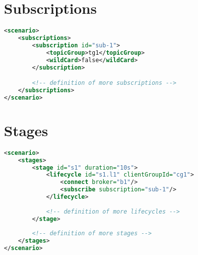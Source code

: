 \section{Subscriptions}
\begin{lstlisting}[caption={XMl definition of subscriptions}, captionpos=b, label={lst:subscriptions}, language=XML]
<scenario>
	<subscriptions>
		<subscription id="sub-1">
			<topicGroup>tg1</topicGroup>
			<wildCard>false</wildCard>
		</subscription>

		<!-- definition of more subscriptions -->
	</subscriptions>
</scenario>
\end{lstlisting}

\section{Stages}
\begin{lstlisting}[caption={XMl definition of Stages}, captionpos=b, label={lst:stages}, language=XML]
<scenario>
	<stages>
		<stage id="s1" duration="10s">
			<lifecycle id="s1.l1" clientGroupId="cg1">
				<connect broker="b1"/>
				<subscribe subscription="sub-1"/>
			</lifecycle>
	
			<!-- definition of more lifecycles -->
		</stage>
	
		<!-- definition of more stages -->
	</stages>
</scenario>
\end{lstlisting}


